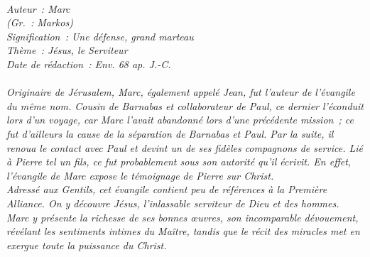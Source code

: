 \BFont
\noindent\hrulefill
{\footnotesize
\textit{
\bigskip
{\centering{}
\\Auteur~: Marc
\\(Gr.~: Markos)
\\Signification~: Une défense, grand marteau
\\Thème~: Jésus, le Serviteur
\\Date de rédaction~: Env. 68 ap. J.-C.\\}
}
\textit{
\\Originaire de Jérusalem, Marc, également appelé Jean, fut l'auteur de l'évangile du même nom. Cousin de Barnabas et collaborateur de Paul, ce dernier l'éconduit lors d'un voyage, car Marc l'avait abandonné lors d'une précédente mission~; ce fut d'ailleurs la cause de la séparation de Barnabas et Paul. Par la suite, il renoua le contact avec Paul et devint un de ses fidèles compagnons de service. Lié à Pierre tel un fils, ce fut probablement sous son autorité qu'il écrivit. En effet, l'évangile de Marc expose le témoignage de Pierre sur Christ.
\\Adressé aux Gentils, cet évangile contient peu de références à la Première Alliance. On y découvre Jésus, l'inlassable serviteur de Dieu et des hommes. Marc y présente la richesse de ses bonnes œuvres, son incomparable dévouement, révélant les sentiments intimes du Maître, tandis que le récit des miracles met en exergue toute la puissance du Christ.\bigskip
}
}
\par\nobreak\noindent\hrulefill
